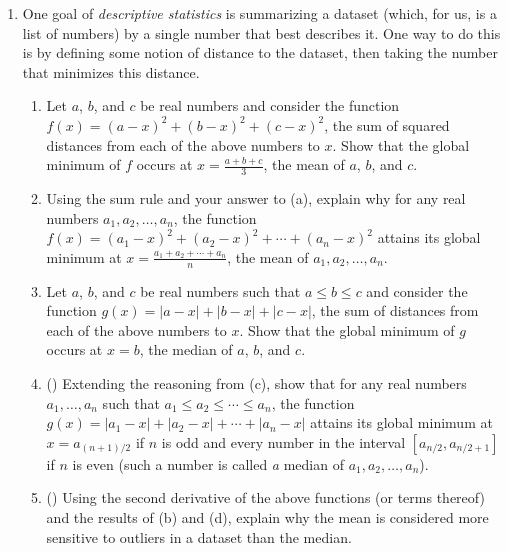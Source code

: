 \documentclass{article}
\begin{document}
\begin{enumerate}

    \item One goal of \textit{descriptive statistics} is summarizing a dataset (which, for us, is a list of numbers) by a single number that best describes it. One way to do this is by defining some notion of distance to the dataset, then taking the number that minimizes this distance.

    \begin{enumerate}
    
        \item Let $a$, $b$, and $c$ be real numbers and consider the function $f(x) = (a-x)^2 + (b-x)^2 + (c-x)^2$, the sum of squared distances from each of the above numbers to $x$. Show that the global minimum of $f$ occurs at $x = \frac{a+b+c}{3}$, the mean of $a$, $b$, and $c$.

        \vfill 

        \item Using the sum rule and your answer to (a), explain why for any real numbers $a_1,a_2,\dots,a_n$, the function $f(x) = (a_1-x)^2 + (a_2-x)^2 + \cdots + (a_n-x)^2$ attains its global minimum at $x = \frac{a_1 + a_2 + \cdots + a_n}{n}$, the mean of $a_1,a_2,\dots,a_n$. 

        \vfill

        \item Let $a$, $b$, and $c$ be real numbers such that $a \leq b \leq c$ and consider the function $g(x) = |a-x| + |b-x| + |c-x|$, the sum of distances from each of the above numbers to $x$. Show that the global minimum of $g$ occurs at $x = b$, the median of $a$, $b$, and $c$. 

        \vfill 

        \item (\textasteriskcentered{}) Extending the reasoning from (c), show that for any real numbers $a_1,\dots,a_n$ such that $a_1 \leq a_2 \leq \cdots \leq a_n$, the function $g(x) = |a_1-x| + |a_2-x| + \cdots + |a_n-x|$ attains its global minimum at $x = a_{(n+1)/2}$ if $n$ is odd and every number in the interval $[a_{n/2},a_{n/2+1}]$ if $n$ is even (such a number is called \textit{a} median of $a_1,a_2,\dots,a_n$).

        \vfill 

        \item (\textasteriskcentered{}) Using the second derivative of the above functions (or terms thereof) and the results of (b) and (d), explain why the mean is considered more sensitive to outliers in a dataset than the median.  


\end{enumerate}
\end{enumerate}
\end{document}
